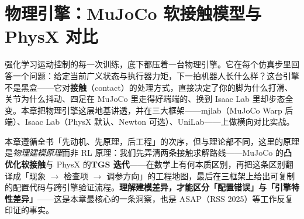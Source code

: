 \chapter{物理引擎：MuJoCo 软接触模型与 PhysX 对比}\label{ch:rlmc-physics}


强化学习运动控制的每一次训练，底下都压着一台物理引擎。它在每个仿真步里回答一个问题：给定当前广义状态与执行器力矩，下一拍机器人长什么样？这台引擎不是黑盒——它对\textbf{接触}（contact）的处理方式，直接决定了你的脚为什么打滑、关节为什么抖动、四足在 MuJoCo 里走得好端端的、换到 Isaac Lab 里却步态全变。本章把物理引擎这层地基讲透，并在三大框架——mjlab（MuJoCo Warp 后端）、Isaac Lab（PhysX 默认、Newton 可选）、UniLab——上做横向对比实战。

本章遵循全书「先动机、先原理，后工程」的次序，但与理论部不同，这里的原理是\emph{物理建模原理}而非 RL 原理：我们先弄清两条接触求解路线——MuJoCo 的\textbf{凸优化软接触}与 PhysX 的\textbf{TGS 迭代}——在数学上有何本质区别，再把这条区别翻译成「现象 $\to$ 检查项 $\to$ 调参方向」的工程地图，最后在三框架上给出可复制的配置代码与跨引擎验证流程。\textbf{理解建模差异，才能区分「配置错误」与「引擎特性差异」}——这是本章最核心的一条洞察，也是 ASAP（RSS 2025）等工作反复印证的事实。

